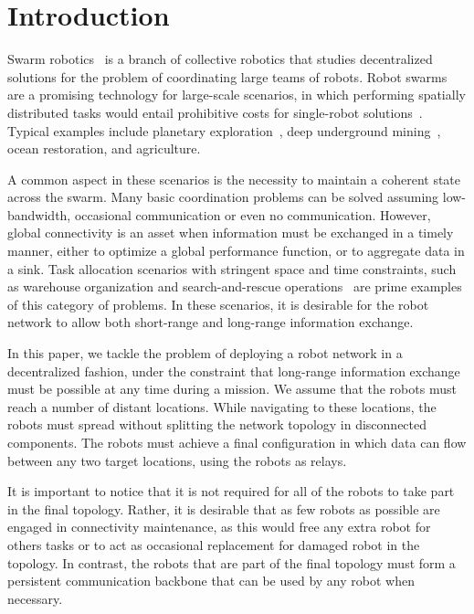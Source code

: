 \section{Introduction}
\label{sec:introduction}

Swarm robotics~\cite{Brambilla2013} is a branch of collective robotics
that studies decentralized solutions for the problem of coordinating
large teams of robots. Robot swarms are a promising technology for
large-scale scenarios, in which performing spatially distributed tasks
would entail prohibitive costs for single-robot
solutions~\cite{Brambilla2013}. Typical examples include planetary
exploration~\cite{Goldsmith1999}, deep underground
mining~\cite{Rubio2012}, ocean restoration, and
agriculture.

A common aspect in these scenarios is the necessity to maintain a
coherent state across the swarm. Many basic coordination problems can
be solved assuming low-bandwidth, occasional communication or even no
communication. However, global connectivity is an asset when
information must be exchanged in a timely manner, either to optimize a
global performance function, or to aggregate data in a sink. Task
allocation scenarios with stringent space and time constraints, such
as warehouse organization and search-and-rescue
operations~\cite{stormont2005} are prime examples of this category of
problems. In these scenarios, it is desirable for the robot network to
allow both short-range and long-range information exchange.

In this paper, we tackle the problem of deploying a robot network in a
decentralized fashion, under the constraint that long-range
information exchange must be possible at any time during a mission.
We assume that the robots must reach a number of distant
locations. While navigating to these locations, the robots must spread
without splitting the network topology in disconnected components. The
robots must achieve a final configuration in which data can flow
between any two target locations, using the robots as relays.

It is important to notice that it is not required for all of the
robots to take part in the final topology. Rather, it is desirable
that as few robots as possible are engaged in connectivity
maintenance, as this would free any extra robot for others tasks or to
act as occasional replacement for damaged robot in the topology. In
contrast, the robots that are part of the final topology must form a
persistent communication backbone that can be used by any robot when
necessary.

